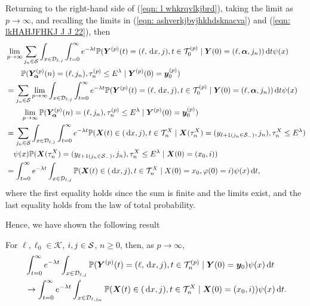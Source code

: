 Returning to the right-hand side of (\ref{eqn: l whkrqvlkjbrd}), taking the limit as \(p\to\infty\), and recalling the limits in (\ref{eqn: ashverkjbvjhkhdsknacva}) and (\ref{eqn: lkHAHJFHKJ J J 22}), then 
\begin{align}
	&\lim_{p\to\infty} \sum_{j_n\in\mathcal S}
	\int_{x\in\mathcal{D}_{\ell,j}} \int_{t=0}^\infty e^{-\lambda t} \mathbb P({\boldsymbol Y}^{(p)}(t) = (\ell,\, \mathrm{d} x, j), 
	t\in\mathcal T_0^{(p)} \mid \nonumber 
	\boldsymbol Y(0) = (\ell,\boldsymbol\alpha,j_n))\, \mathrm{d} t \psi(x)
	\\&\qquad{}  \mathbb P(\bm{Y}_{\bm{\alpha}}^{(p)}(n) = (\ell, j_n), \tau_{n}^{(p)}\leq E^\lambda 
	\mid \boldsymbol Y^{(p)}(0)=\boldsymbol y_0^{(p)}) \nonumber 
	\\&= \sum_{j_n\in\mathcal S}\lim_{p\to\infty}
	\int_{x\in\mathcal{D}_{\ell,j}} \int_{t=0}^\infty e^{-\lambda t} \mathbb P({\boldsymbol Y}^{(p)}(t) = (\ell,\, \mathrm{d} x, j), 
	t\in\mathcal T_0^{(p)} \mid \nonumber 
	\boldsymbol Y(0) = (\ell,\boldsymbol\alpha,j_n))\, \mathrm{d} t \psi(x)
	\\&\qquad{} \lim_{p\to\infty} \mathbb P(\bm{Y}_{\bm{\alpha}}^{(p)}(n) = (\ell, j_n), \tau_{n}^{(p)}\leq E^\lambda 
	\mid \boldsymbol Y^{(p)}(0)=\boldsymbol y_0^{(p)})\nonumber 
	\\&=\sum_{j_n\in\mathcal S}\int_{x\in\mathcal{D}_{\ell,j}} \int_{t=0}^\infty e^{-\lambda t} \mathbb P(\boldsymbol X(t)\in(\, \mathrm{d} x, j), t\in\mathcal T_n^{X} \mid \boldsymbol X(\tau_n^X) = (y_{\ell+1(j_n\in\mathcal S_-)}, j_n),\nonumber 
	\tau_n^X\leq E^\lambda ) 
	\\&\quad{} \psi(x)\mathbb P(\boldsymbol X(\tau_n^X) = (y_{\ell+1(j_{n}\in\mathcal S_-)}, 
	j_n), \tau_{n}^X\leq E^\lambda
	\mid \boldsymbol X(0)=(x_0,i))\nonumber
	\\&= \int_{t=0}^\infty e^{-\lambda t}  \int_{x\in\mathcal{D}_{\ell,j}}\mathbb P(\boldsymbol X(t)\in(\, \mathrm{d} x, j), t\in\mathcal T_n^{X} 
	\mid X(0)=x_0, \varphi(0)=i)\psi(x)\, \mathrm{d} t,
\end{align}
where the first equality holds since the sum is finite and the limits exist, and the last equality holds from the law of total probability. 

Hence, we have shown the following result 
\begin{lem}\label{lem: LAkAKFnvnb mav h}
	For \(\ell,\ell_0\in\mathcal K\), \(i,j\in\mathcal{S}\), \(n\geq 0\), then, as \(p\to\infty\), 
	\begin{align} 
		&\int_{t=0}^\infty e^{-\lambda t}\int_{x\in\mathcal{D}_{\ell,j}}\mathbb P({\boldsymbol Y}^{(p)}(t) = (\ell,\, \mathrm{d} x, j), t\in\mathcal T_n^{(p)} \mid  \nonumber 
		\boldsymbol Y(0) = \boldsymbol y_0)\psi(x)\, \mathrm{d} t \nonumber
		\\&\to\int_{t=0}^\infty e^{-\lambda t}  \int_{x\in\mathcal{D}_{\ell,j_n}}\mathbb P(\boldsymbol X(t)\in(\, \mathrm{d} x, j), t\in\mathcal T_n^{X} 
		\mid \boldsymbol X(0)=(x_0,i))\psi(x)\, \mathrm{d} t.
	\end{align}
\end{lem}

